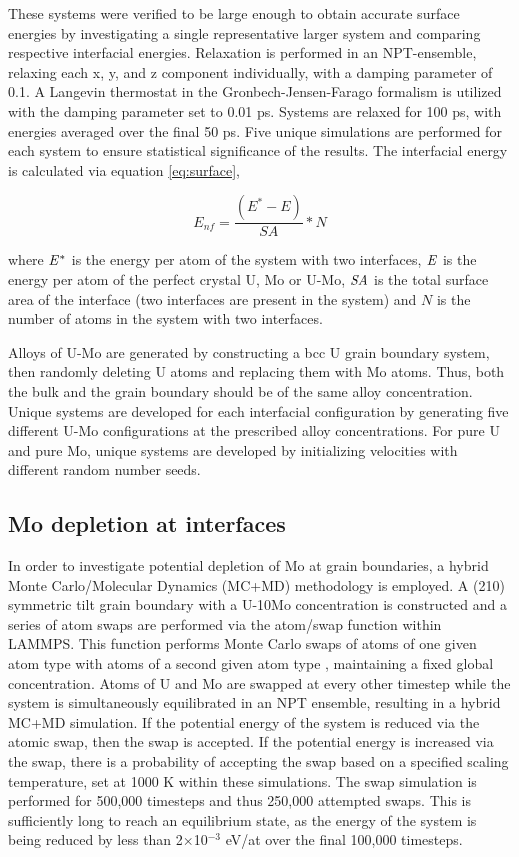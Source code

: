 \documentclass[review]{elsarticle}
\begin{document}
These systems were verified to be large enough to obtain accurate surface energies by investigating a single representative larger system and comparing respective interfacial energies. Relaxation is performed in an NPT-ensemble, relaxing each x, y, and z component individually, with a damping parameter of 0.1. A Langevin thermostat in the Gronbech-Jensen-Farago \cite{gjf2014} formalism is utilized with the damping parameter set to 0.01 ps. Systems are relaxed for 100 ps, with energies averaged over the final 50 ps. Five unique simulations are performed for each system to ensure statistical significance of the results. The interfacial energy is calculated via equation \ref{eq:surface},

\begin{equation}
\label{eq:surface}
E_{nf}= \frac{(E^{*} - E)}{SA} * N
\end{equation}

where $\it{E^{*}}$ is the energy per atom of the system with two interfaces, $\it{E}$ is the energy per atom of the perfect crystal U, Mo or U-Mo, $\it{SA}$ is the total surface area of the interface (two interfaces are present in the system) and $\textit{N}$ is the number of atoms in the system with two interfaces. 

Alloys of U-Mo are generated by constructing a bcc U grain boundary system, then randomly deleting U atoms and replacing them with Mo atoms. Thus, both the bulk and the grain boundary should be of the same alloy concentration. Unique systems are developed for each interfacial configuration by generating five different U-Mo configurations at the prescribed alloy concentrations. For pure U and pure Mo, unique systems are developed by initializing velocities with different random number seeds. 

\subsection{Mo depletion at interfaces}

In order to investigate potential depletion of Mo at grain boundaries, a hybrid Monte Carlo/Molecular Dynamics (MC+MD) methodology is employed. A (210) symmetric tilt grain boundary with a U-10Mo concentration is constructed and a series of atom swaps are performed via the atom/swap function within LAMMPS. This function performs Monte Carlo swaps of atoms of one given atom type with atoms of a second given atom type \cite{plimpton1995}, maintaining a fixed global concentration. Atoms of U and Mo are swapped at every other timestep while the system is simultaneously equilibrated in an NPT ensemble, resulting in a hybrid MC+MD simulation. If the potential energy of the system is reduced via the atomic swap, then the swap is accepted. If the potential energy is increased via the swap, there is a probability of accepting the swap based on a specified scaling temperature, set at 1000 K within these simulations. The swap simulation is performed for 500,000 timesteps and thus 250,000 attempted swaps. This is sufficiently long to reach an equilibrium state, as the energy of the system is being reduced by less than 2$\times$10$^{-3}$ eV/at over the final 100,000 timesteps.
\end{document}
